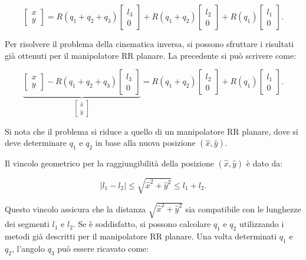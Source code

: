 \documentclass[11pt, a4paper]{report}
\begin{document}
\[
    \begin{bmatrix}
    x \\
    y
    \end{bmatrix}
    =
    R(q_1 + q_2 + q_3)
    \begin{bmatrix}
    l_3 \\
    0
    \end{bmatrix}
    +
    R(q_1 + q_2)
    \begin{bmatrix}
    l_2 \\
    0
    \end{bmatrix}
    +
    R(q_1)
    \begin{bmatrix}
    l_1 \\
    0
    \end{bmatrix}.
\]


Per risolvere il problema della cinematica inversa, si possono sfruttare i risultati già ottenuti per il manipolatore RR planare. La precedente si può scrivere come:

\[
\underbrace{
    \begin{bmatrix}
    x \\
    y
    \end{bmatrix}
    -
    R(q_1 + q_2 + q_3)
    \begin{bmatrix}
    l_3 \\
    0
    \end{bmatrix}
    }_{\begin{bmatrix}
    \hat{x} \\
    \hat{y}
    \end{bmatrix}}
    =
    R(q_1 + q_2)
    \begin{bmatrix}
    l_2 \\
    0
    \end{bmatrix}
    +
    R(q_1)
    \begin{bmatrix}
    l_1 \\
    0
    \end{bmatrix}.
\]

Si nota che il problema si riduce a quello di un manipolatore RR planare, dove si deve determinare $ q_1 $ e $ q_2 $ in base alla nuova posizione $ (\hat{x}, \hat{y}) $.

Il vincolo geometrico per la raggiungibilità della posizione $ (\hat{x}, \hat{y}) $ è dato da:

\[
|l_1 - l_2| \leq \sqrt{\hat{x}^2 + \hat{y}^2} \leq l_1 + l_2.
\]

Questo vincolo assicura che la distanza $ \sqrt{\hat{x}^2 + \hat{y}^2} $ sia compatibile con le lunghezze dei segmenti $ l_1 $ e $ l_2 $. Se è soddisfatto, si possono calcolare $ q_1 $ e $ q_2 $ utilizzando i metodi già descritti per il manipolatore RR planare. Una volta determinati $ q_1 $ e $ q_2 $, l'angolo $ q_3 $ può essere ricavato come:
\end{document}
